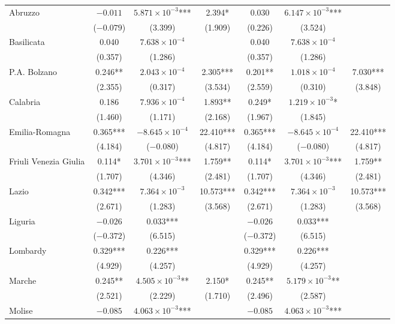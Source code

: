 \documentclass[12pt]{article}
\begin{document}
\begin{appendices}
\begin{longtable}{@{}lcccccc@{}}
            Abruzzo & $-0.011$ & $5.871 \times 10^{-3}$*** & 2.394* & 0.030 & $6.147 \times 10^{-3}$*** &  \\ 
             & ($-0.079$) & (3.399) & (1.909) & (0.226) & (3.524) &  \\ 
            Basilicata & 0.040 & $7.638 \times 10^{-4}$ &  & 0.040 & $7.638 \times 10^{-4}$ &  \\ 
             & (0.357) & (1.286) &   & (0.357) & (1.286) &  \\ 
            P.A. Bolzano & 0.246** & $2.043 \times 10^{-4}$ & 2.305*** & 0.201** & $1.018 \times 10^{-4}$ & 7.030*** \\ 
             & (2.355) & (0.317) & (3.534) & (2.559) & (0.310) & (3.848) \\ 
            Calabria & 0.186 & $7.936 \times 10^{-4}$ & 1.893** & 0.249* & $1.219 \times 10^{-3}$* &  \\ 
             & (1.460) & (1.171) & (2.168) & (1.967) & (1.845) &  \\ 
            Emilia-Romagna & 0.365*** & $-8.645 \times 10^{-4}$ & 22.410*** & 0.365*** & $-8.645 \times 10^{-4}$ & 22.410*** \\ 
             & (4.184) & ($-0.080$) & (4.817) & (4.184) & ($-0.080$) & (4.817) \\ 
            Friuli Venezia Giulia & 0.114* & $3.701 \times 10^{-3}$*** & 1.759** & 0.114* & $3.701 \times 10^{-3}$*** & 1.759** \\ 
             & (1.707) & (4.346) & (2.481) & (1.707) & (4.346) & (2.481) \\ 
            Lazio & 0.342*** & $7.364 \times 10^{-3}$ & 10.573*** & 0.342*** & $7.364 \times 10^{-3}$ & 10.573*** \\ 
             & (2.671) & (1.283) & (3.568) & (2.671) & (1.283) & (3.568) \\ 
            Liguria & $-0.026$ & 0.033*** &  & $-0.026$ & 0.033*** &  \\ 
             & ($-0.372$) & (6.515) &  & ($-0.372$) & (6.515) &  \\ 
            Lombardy & 0.329*** & 0.226*** &  & 0.329*** & 0.226*** &  \\ 
             & (4.929) & (4.257) &  & (4.929) & (4.257) &  \\ 
            Marche & 0.245** & $4.505 \times 10^{-3}$** & 2.150* & 0.245** & $5.179 \times 10^{-3}$** &  \\ 
             & (2.521) & (2.229) & (1.710) & (2.496) & (2.587) &  \\ 
            Molise & $-0.085$ & $4.063 \times 10^{-3}$*** &  & $-0.085$ & $4.063 \times 10^{-3}$*** &  \\ 

\end{longtable}
\end{appendices}
\end{document}
